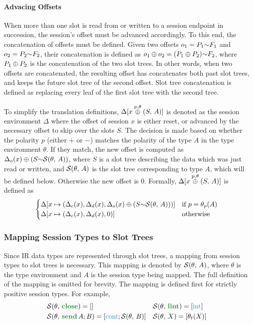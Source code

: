 \documentclass[sigconf,nonacm,natbib=true]{acmart}
\begin{document}
\paragraph{Advacing Offsets}

When more than one slot is read from or written to a session endpoint in succession, the session's offset must be advanced accordingly. To this end, the concatenation of offsets must be defined. Given two offsets $o_1 = P_1\text{$\sim$}F_1$ and $o_2 = P_2\text{$\sim$}F_2$, their concatenation is defined as $o_1\oplus o_2 = (P_1\oplus P_2)\text{$\sim$}F_2$, where $P_1\oplus P_2$ is the concatenation of the two slot trees. In other words, when two offsets are concatenated, the resulting offset has concatenates both past slot trees, and keeps the future slot tree of the second offset. Slot tree concatenation is defined as replacing every leaf of the first slot tree with the second tree.

To simplify the translation definitions, $\Delta[x \overset{p,\theta}{\oplus} (S,\,A)]$ is denoted as the session environment $\Delta$ where the offset of session $x$ is either reset, or advanced by the necessary offset to skip over the slots $S$. The decision is made based on whether the polarity $p$ (either $+$ or $-$) matches the polarity of the type $A$ in the type environment $\theta$. If they match, the new offset is computed as $\Delta_o(x)\oplus(S\text{$\sim$}\mathcal{S}(\theta,\,A))$, where $S$ is a slot tree describing the data which was just read or written, and $\mathcal{S}(\theta,\,A)$ is the slot tree corresponding to type $A$, which will be defined below. Otherwise the new offset is $0$. Formally, $\Delta[x \overset{p,\theta}{\oplus} (S,\,A)]$ is defined as
\[\begin{cases}
    \Delta[x \mapsto (\Delta_c(x), \Delta_d(x), \Delta_o(x)\oplus(S\text{$\sim$}\mathcal{S}(\theta,\,A)))] & \text{if } p = \theta_{p}(A) \\
    \Delta[x \mapsto (\Delta_c(x), \Delta_d(x), 0)] & \text{otherwise}
\end{cases}\]

\subsubsection{Mapping Session Types to Slot Trees} \label{subsubsection:MappingSessionTypesToSlots}

Since \ac{IR} data types are represented through slot trees, a mapping from session types to slot trees is necessary. This mapping is denoted by $\mathcal{S}(\theta,\,A)$, where $\theta$ is the type environment and $A$ is the session type being mapped. The full definition of the mapping is omitted for brevity. The mapping is defined first for strictly positive session types. For example,
\[\begin{aligned}&\slots{\theta}{\closet} = \nilst
  &&\slots{\theta}{\lintt} = \seqst{\ints} \\ &\slots{\theta}{\sendt{A}{B}} = \seqst{\conts; \slots{\theta}{B}} &&\slots{\theta}{X} = \seqst{\typeidof{\theta}{X}}\\
\end{aligned}\]
\end{document}
